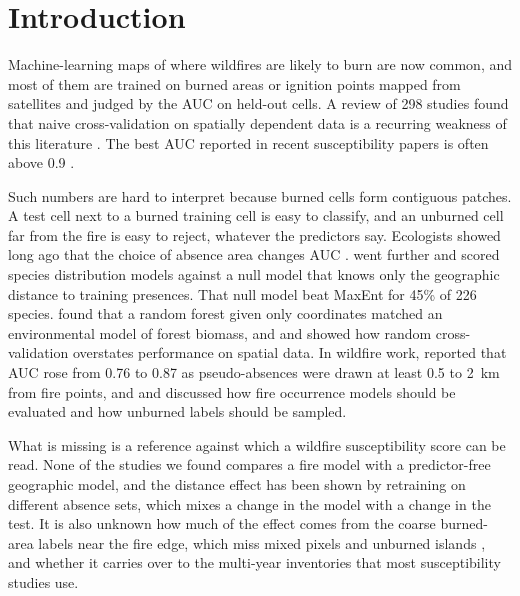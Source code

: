 \documentclass[preprint,12pt,authoryear]{elsarticle}
\begin{document}
\section{Introduction}
\label{sec:intro}

Machine-learning maps of where wildfires are likely to burn are now common, and most of them are trained on burned areas or ignition points mapped from satellites and judged by the AUC on held-out cells. A review of 298 studies found that naive cross-validation on spatially dependent data is a recurring weakness of this literature \citep{Jain2020}. The best AUC reported in recent susceptibility papers is often above 0.9 \citep{Iban2022,Trucchia2023,Zerouali2026}.

Such numbers are hard to interpret because burned cells form contiguous patches. A test cell next to a burned training cell is easy to classify, and an unburned cell far from the fire is easy to reject, whatever the predictors say. Ecologists showed long ago that the choice of absence area changes AUC \citep{Lobo2008,VanDerWal2009}. \citet{Hijmans2012} went further and scored species distribution models against a null model that knows only the geographic distance to training presences. That null model beat MaxEnt for 45\% of 226 species. \citet{Ploton2020} found that a random forest given only coordinates matched an environmental model of forest biomass, and \citet{Meyer2018} and \citet{Roberts2017} showed how random cross-validation overstates performance on spatial data. In wildfire work, \citet{Zerouali2026} reported that AUC rose from 0.76 to 0.87 as pseudo-absences were drawn at least 0.5 to 2~km from fire points, and \citet{PhelpsWoolford2021} and \citet{Quan2023} discussed how fire occurrence models should be evaluated and how unburned labels should be sampled.

What is missing is a reference against which a wildfire susceptibility score can be read. None of the studies we found compares a fire model with a predictor-free geographic model, and the distance effect has been shown by retraining on different absence sets, which mixes a change in the model with a change in the test. It is also unknown how much of the effect comes from the coarse burned-area labels near the fire edge, which miss mixed pixels and unburned islands \citep{Boschetti2019}, and whether it carries over to the multi-year inventories that most susceptibility studies use.
\end{document}
